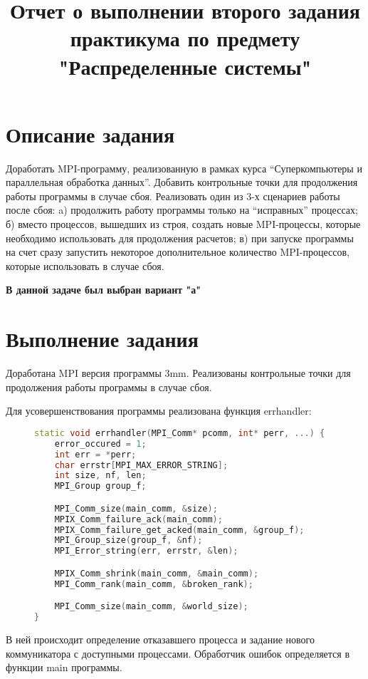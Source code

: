 \documentclass[12pt, oneside, a4paper]{article}
\begin{document}
\title{Отчет о выполнении второго задания практикума по предмету "Распределенные системы"}

\section{Описание задания}

Доработать MPI-программу, реализованную в рамках курса “Суперкомпьютеры и параллельная обработка данных”. Добавить контрольные точки для продолжения работы программы в случае сбоя. Реализовать один из 3-х сценариев работы после сбоя: a) продолжить работу программы только на “исправных” процессах; б) вместо процессов, вышедших из строя, создать новые MPI-процессы, которые необходимо использовать для продолжения расчетов; в) при запуске программы на счет сразу запустить некоторое дополнительное количество MPI-процессов, которые использовать в случае сбоя.

\textbf{В данной задаче был выбран вариант "а"}

\section{Выполнение задания}

Доработана MPI версия программы 3mm. Реализованы контрольные точки для продолжения работы программы в случае сбоя. 

Для усовершенствования программы реализована функция errhandler:

\begin{figure}[h]
\begin{lstlisting}[language=C++]
static void errhandler(MPI_Comm* pcomm, int* perr, ...) {
    error_occured = 1;
    int err = *perr;
    char errstr[MPI_MAX_ERROR_STRING];
    int size, nf, len;
    MPI_Group group_f;

    MPI_Comm_size(main_comm, &size);
    MPIX_Comm_failure_ack(main_comm);
    MPIX_Comm_failure_get_acked(main_comm, &group_f);
    MPI_Group_size(group_f, &nf);
    MPI_Error_string(err, errstr, &len);

    MPIX_Comm_shrink(main_comm, &main_comm);
    MPI_Comm_rank(main_comm, &broken_rank);

    MPI_Comm_size(main_comm, &world_size);
}
\end{lstlisting}
\end{figure}

В ней происходит определение отказавшего процесса и задание нового коммуникатора с доступными процессами. Обработчик ошибок определяется в функции main программы.
\end{document}
